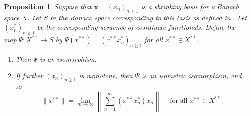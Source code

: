 \documentclass[11pt]{article}
\theoremstyle{thmstyle}
\newtheorem{proposition}[theorem]{Proposition}
\theoremstyle{defstyle}
\renewcommand{\ge}{\geqslant}
\begin{document}
\begin{proposition}
	Suppose that $\mathbf x = (x_n)_{n\ge 1}$ is a shrinking basis for a Banach space $X$. Let $S$ be the Banach space corresponding to this basis as defined in . Let $(x_n^\ast)_{n\ge 1}$ be the corresponding sequence of coordinate functionals. Define the map $\Psi\colon X^{\ast\ast}\to S$ by $\Psi(x^{\ast\ast}) = \left(x^{\ast\ast}x_n^\ast\right)_{n\ge 1}$ for all $x^{\ast\ast}\in X^{\ast\ast}$. 
	\begin{enumerate}[label=(\arabic*)]
		\item Then $\Psi$ is an isomorphism. 
		\item If further $(x_n)_{n\ge 1}$ is monotone, then $\Psi$ is an isometric isomorphism, and so 
		\begin{equation*}
			\|x^{\ast\ast}\| = \lim_{m\to\infty}\left\|\sum_{n = 1}^m (x^{\ast\ast}x_n^\ast)x_n\right\|\quad\text{ for all }x^{\ast\ast}\in X^{\ast\ast}.
		\end{equation*}
	\end{enumerate}
\end{proposition}
\end{document}
